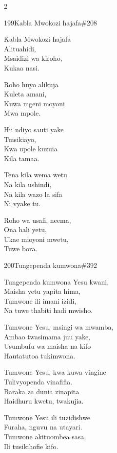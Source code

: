 \begin{multicols}{2}
\begin{hymn}{199}{Kabla Mwokozi hajafa}{\#208}
\begin{stanza}
Kabla Mwokozi hajafa\\
Alituahidi,\\
Msaidizi wa kiroho,\\
Kukaa nasi.
\end{stanza}
\begin{stanza}
Roho huyo alikuja\\
Kuleta amani,\\
Kuwa mgeni moyoni\\
Mwa mpole.
\end{stanza}
\begin{stanza}
Hii ndiyo sauti yake\\
Tuisikiayo,\\
Kwa upole kuzuia\\
Kila tamaa.
\end{stanza}
\begin{stanza}
Tena kila wema wetu\\
Na kila ushindi,\\
Na kila wazo la sifa\\
Ni vyake tu.
\end{stanza}
\begin{stanza}
Roho wa usafi, neema,\\
Ona hali yetu,\\
Ukae mioyoni mwetu,\\
Tuwe bora.
\end{stanza}
\end{hymn}

\begin{hymn}{200}{Tungependa kumwona}{\#392}
\begin{stanza}
Tungependa kumwona Yesu kwani,\\
Maisha yetu yapita hima,\\
Tumwone ili imani izidi,\\
Na tuwe thabiti hadi mwisho.
\end{stanza}
\begin{stanza}
Tumwone Yesu, msingi wa mwamba,\\
Ambao twasimama juu yake,\\
Usumbufu wa maisha na kifo\\
Hautatutoa tukimwona.
\end{stanza}
\begin{stanza}
Tumwone Yesu, kwa kuwa vingine\\
Tulivyopenda vinafifia.\\
Baraka za dunia zinapita\\
Haidhuru kwetu, twakujia.
\end{stanza}
\begin{stanza}
Tumwone Yesu ili tuzidishwe\\
Furaha, nguvu na utayari.\\
Tumwone akituombea sasa,\\
Ili tusikihofie kifo.
\end{stanza}
\end{hymn}


\end{multicols}
